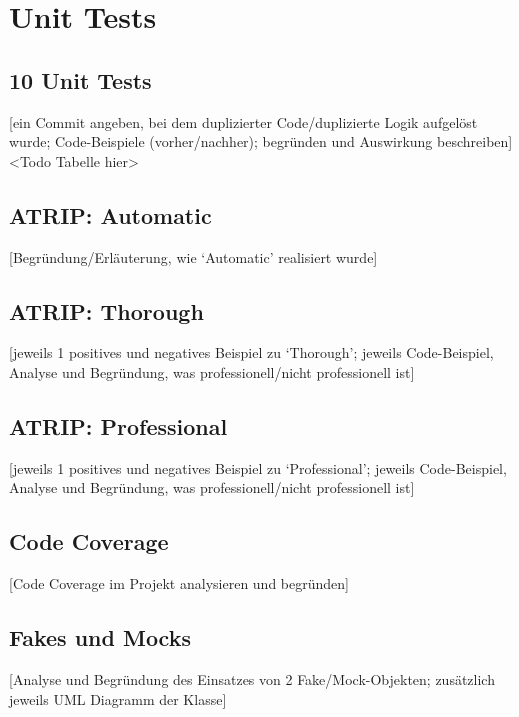 \chapter{Unit Tests}
\section{10 Unit Tests}
[ein Commit angeben, bei dem duplizierter Code/duplizierte Logik aufgelöst wurde; Code-Beispiele (vorher/nachher); begründen und Auswirkung beschreiben]
<Todo Tabelle hier>

\section{ATRIP: Automatic}
[Begründung/Erläuterung, wie ‘Automatic’ realisiert wurde]

\section{ATRIP: Thorough}
[jeweils 1 positives und negatives Beispiel zu ‘Thorough’; jeweils Code-Beispiel, Analyse und Begründung, was professionell/nicht professionell ist]

\section{ATRIP: Professional}
[jeweils 1 positives und negatives Beispiel zu ‘Professional’; jeweils Code-Beispiel, Analyse und Begründung, was professionell/nicht professionell ist]

\section{Code Coverage}
[Code Coverage im Projekt analysieren und begründen]

\section{Fakes und Mocks}
[Analyse und Begründung des Einsatzes von 2 Fake/Mock-Objekten; zusätzlich jeweils UML Diagramm der Klasse]